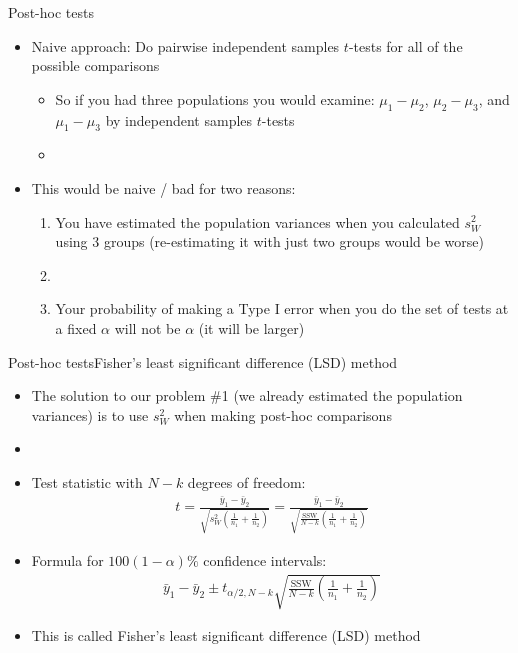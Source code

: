 \documentclass[xcolor=dvipsnames]{beamer}
\begin{document}
\begin{frame}{Post-hoc tests}
\begin{itemize}
	\item Naive approach: Do pairwise independent samples $t$-tests for all of the possible comparisons
	\begin{itemize}
		\item So if you had three populations you would examine: $\mu_1-\mu_2$, $\mu_2-\mu_3$, and $\mu_1-\mu_3$ by independent samples $t$-tests
		\item[]
	\end{itemize}
	\item This would be naive / bad for two reasons:
	\begin{enumerate}
		\item You have estimated the population variances when you calculated $s^2_W$ using 3 groups (re-estimating it with just two groups would be worse)
		\item[]
		\item Your probability of making a Type I error when you do the set of tests at a fixed $\alpha$ will not be $\alpha$ (it will be larger)
	\end{enumerate}
\end{itemize}
\end{frame}



\begin{frame}{Post-hoc tests}{Fisher's least significant difference (LSD) method}
	\begin{itemize}
		\item The solution to our problem \#1 (we already estimated the population variances) is to use $s^2_W$ when making post-hoc comparisons
		\item[]
		\item Test statistic with $N-k$ degrees of freedom:
		\begin{gather*}
			t = \frac{\bar{y}_1 - \bar{y}_2}{\sqrt{s^2_W\left(\frac{1}{n_1}+\frac{1}{n_2}\right)}} = \frac{\bar{y}_1 - \bar{y}_2}{\sqrt{\frac{\text{SSW}}{N-k} \left(\frac{1}{n_1}+\frac{1}{n_2}\right)}}
		\end{gather*}
		\item Formula for $100(1-\alpha)\%$ confidence intervals:
		\begin{gather*}
			\bar{y}_1 - \bar{y}_2 \pm t_{\alpha / 2, N - k}{\sqrt{\frac{\text{SSW}}{N-k} \left(\frac{1}{n_1}+\frac{1}{n_2}\right)}}
		\end{gather*}
		\item This is called Fisher's least significant difference (LSD) method
	\end{itemize}
\end{frame}
\end{document}
